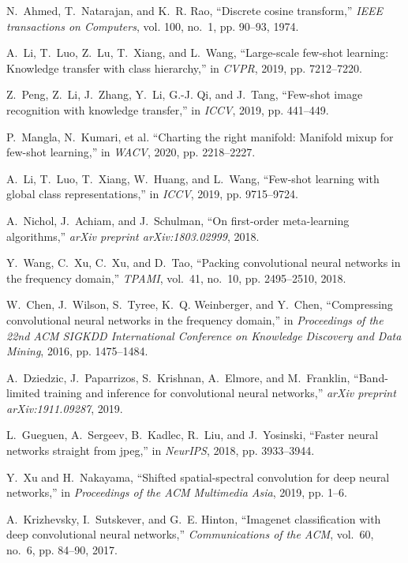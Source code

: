 \documentclass[10pt, conference, compsocconf]{IEEEtran}
\begin{document}
\begin{thebibliography}{10}
N.~Ahmed, T.~Natarajan, and K.~R. Rao, ``Discrete cosine transform,''
  \emph{IEEE transactions on Computers}, vol. 100, no.~1, pp. 90--93, 1974.
  
A.~Li, T.~Luo, Z.~Lu, T.~Xiang, and L.~Wang, ``Large-scale few-shot learning:
  Knowledge transfer with class hierarchy,'' in \emph{CVPR}, 2019, pp.
  7212--7220.

Z.~Peng, Z.~Li, J.~Zhang, Y.~Li, G.-J. Qi, and J.~Tang, ``Few-shot image
  recognition with knowledge transfer,'' in \emph{ICCV}, 2019, pp. 441--449.

P.~Mangla, N.~Kumari, et al. ``Charting the right manifold: Manifold mixup for few-shot
  learning,'' in \emph{WACV}, 2020, pp. 2218--2227.

A.~Li, T.~Luo, T.~Xiang, W.~Huang, and L.~Wang, ``Few-shot learning with global
  class representations,'' in \emph{ICCV}, 2019, pp. 9715--9724.

A.~Nichol, J.~Achiam, and J.~Schulman, ``On first-order meta-learning
  algorithms,'' \emph{arXiv preprint arXiv:1803.02999}, 2018.

Y.~Wang, C.~Xu, C.~Xu, and D.~Tao, ``Packing convolutional neural networks in
  the frequency domain,'' \emph{TPAMI}, vol.~41, no.~10, pp. 2495--2510, 2018.

W.~Chen, J.~Wilson, S.~Tyree, K.~Q. Weinberger, and Y.~Chen, ``Compressing
  convolutional neural networks in the frequency domain,'' in \emph{Proceedings
  of the 22nd ACM SIGKDD International Conference on Knowledge Discovery and
  Data Mining}, 2016, pp. 1475--1484.

A.~Dziedzic, J.~Paparrizos, S.~Krishnan, A.~Elmore, and M.~Franklin,
  ``Band-limited training and inference for convolutional neural networks,''
  \emph{arXiv preprint arXiv:1911.09287}, 2019.

L.~Gueguen, A.~Sergeev, B.~Kadlec, R.~Liu, and J.~Yosinski, ``Faster neural
  networks straight from jpeg,'' in \emph{NeurIPS}, 2018, pp. 3933--3944.

Y.~Xu and H.~Nakayama, ``Shifted spatial-spectral convolution for deep neural
  networks,'' in \emph{Proceedings of the ACM Multimedia Asia}, 2019, pp. 1--6.

A.~Krizhevsky, I.~Sutskever, and G.~E. Hinton, ``Imagenet classification with
  deep convolutional neural networks,'' \emph{Communications of the ACM},
  vol.~60, no.~6, pp. 84--90, 2017.


\end{thebibliography}
\end{document}

